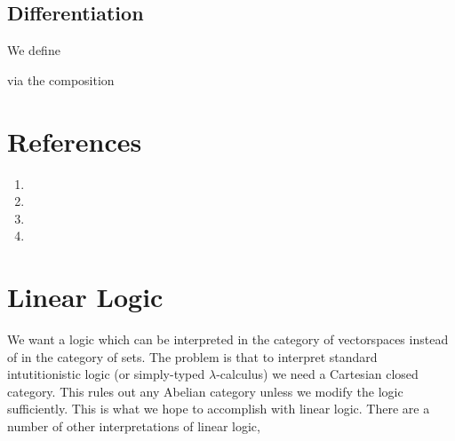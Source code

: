 \documentclass[12pt]{article}
\begin{document}
\subsection{Differentiation}

We define

\begin{center}
\begin{prooftree}
\end{prooftree}
\end{center}
via the composition

\begin{center}
\begin{prooftree}
\end{prooftree}
\end{center}


\section{References}

\begin{enumerate}
\item {}

\item {}

\item  {}

\item {}
\end{enumerate}

\section{Linear Logic}

\newcommand{\oto}{\multimap}

We want a logic which can be interpreted in the category of vectorspaces instead of in the category of sets. The problem is that to interpret standard intutitionistic logic (or simply-typed $\lambda$-calculus) we need a Cartesian closed category. This rules out any Abelian category unless we modify the logic sufficiently. This is what we hope to accomplish with linear logic. There are a number of other interpretations of linear logic,
\end{document}
